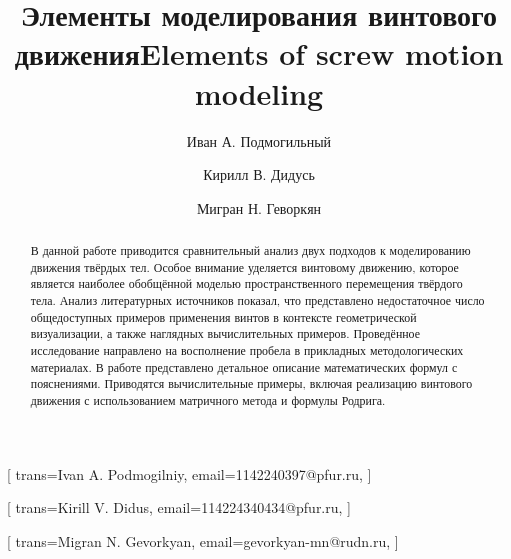 \documentclass[%
]{ittmm}
\begin{document}



\title{Элементы моделирования винтового движения}
\title[mode=trans]{Elements of screw motion modeling}


\author[1]{Иван А. Подмогильный}[%
trans={Ivan A. Podmogilniy},
email=1142240397@pfur.ru,
]
\cormark[1]

\author[1]{Кирилл В. Дидусь}[%
trans={Kirill V. Didus},
email=114224340434@pfur.ru,
]

\author[1]{Мигран Н. Геворкян}[%
trans={Migran N. Gevorkyan},
email=gevorkyan-mn@rudn.ru,
]

\address[1]{Российский университет дружбы народов, ул. Миклухо-Маклая, д. 6, Москва, 117198, Российская Федерация}


\begin{abstract}
  В данной работе приводится сравнительный анализ двух подходов к моделированию движения твёрдых тел. Особое внимание уделяется винтовому движению, которое является наиболее обобщённой моделью пространственного перемещения твёрдого тела. Анализ литературных источников показал, что представлено недостаточное число общедоступных примеров применения винтов в контексте геометрической визуализации, а также наглядных вычислительных примеров. Проведённое исследование направлено на восполнение пробела в прикладных методологических материалах. В работе представлено детальное описание математических формул с пояснениями. Приводятся вычислительные примеры, включая реализацию винтового движения с использованием матричного метода и формулы Родрига.
\end{abstract}
\end{document}
